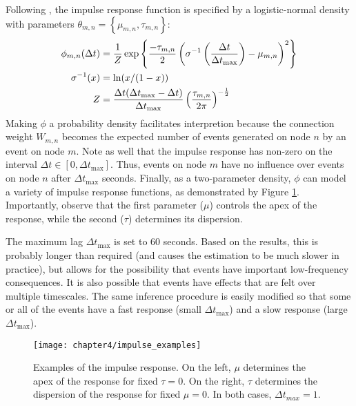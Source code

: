 		Following \cite{Linderman2015}, the impulse response function is specified by a logistic-normal density with parameters $\theta_{m , n} = \left \{ \mu_{m , n}, \tau_{m , n} \right \}$:
		\begin{align}
		\phi_{m, n}(\Delta t) &= \frac{1}{Z} \exp \left \{ \frac{-\tau_{m , n}}{2} \left( \sigma^{-1} \left( \frac{\Delta t}{\Delta t_{\text{max}}} \right) - \mu_{m , n} \right)^2  \right \} \notag \\
		\sigma^{-1}(x) &= \ln(x/(1-x)) \notag \\
		Z &= \frac{\Delta t (\Delta t_{\text{max}} - \Delta t)}{\Delta t_{\text{max}}} \left( \frac{\tau_{m , n}}{2 \pi} \right)^{-\frac{1}{2}}
		\end{align}
		Making $\phi$ a probability density facilitates interpretion because the connection weight $W_{m,n}$ becomes the expected number of events generated on node $n$ by an event on node $m$. Note as well that the impulse response has non-zero on the interval $\Delta t \in [0, \Delta t_{\text{max}}]$. Thus, events on node $m$ have no influence over events on node $n$ after $\Delta t_{\text{max}}$ seconds. Finally, as a two-parameter density, $\phi$ can model a variety of impulse response functions, as demonstrated by Figure \ref{fig:impulse_examples}. Importantly, observe that the first parameter ($\mu$) controls the apex of the response, while the second ($\tau$) determines its dispersion.

		The maximum lag $\Delta t_{\text{max}}$ is set to 60 seconds. Based on the results, this is probably longer than required (and causes the estimation to be much slower in practice), but allows for the possibility that events have important low-frequency consequences. It is also possible that events have effects that are felt over multiple timescales. The same inference procedure is easily modified so that some or all of the events have a fast response (small $\Delta t_{\text{max}}$) and a slow response (large $\Delta t_{\text{max}}$).

		\begin{figure}[t]
			\small
			\linespread{1}
			\centering
			\texttt{[image: chapter4/impulse\_examples]}
			\captionsetup{skip=-20pt, labelsep=colon, font=footnotesize, width=\linewidth}
			\caption[Examples of the impulse response]{Examples of the impulse response. On the left, $\mu$ determines the apex of the response for fixed $\tau=0$. On the right, $\tau$ determines the dispersion of the response for fixed $\mu=0$. In both cases, $\Delta t_{max} = 1$.}
			\label{fig:impulse_examples}
		\end{figure}

